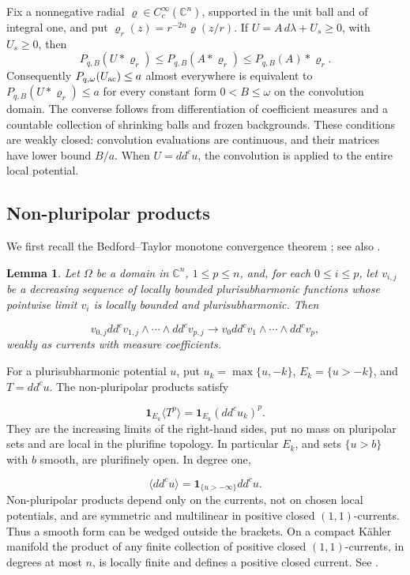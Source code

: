 \documentclass[reqno]{amsart}
\numberwithin{equation}{section}
\newtheorem{lemma}[theorem]{Lemma}
\theoremstyle{definition}
\begin{document}
Fix a nonnegative radial $\varrho\in C_c^\infty(\mathbb C^n)$, supported in the unit ball and of integral one, and put $\varrho_r(z)=r^{-2n}\varrho(z/r)$. If $U=A\,d\lambda+U_s\ge0$, with $U_s\ge0$, then
\begin{equation}\label{eq:convolution}
 P_{q,B}(U*\varrho_r)
 \le P_{q,B}(A*\varrho_r)
 \le P_{q,B}(A)*\varrho_r.
\end{equation}
Consequently $P_{q,\omega}(U_{\rm ac})\le a$ almost everywhere is equivalent to $P_{q,B}(U*\varrho_r)\le a$ for every constant form $0<B\le\omega$ on the convolution domain. The converse follows from differentiation of coefficient measures and a countable collection of shrinking balls and frozen backgrounds. These conditions are weakly closed: convolution evaluations are continuous, and their matrices have lower bound $B/a$. When $U=dd^cu$, the convolution is applied to the entire local potential.
\subsection{Non-pluripolar products} 
We first recall the Bedford--Taylor monotone convergence theorem \cite[Theorem~2.1 and Corollary~2.2]{BT82}; see also \cite[Chapter~III, Theorem~3.7(a)]{D12}.
\begin{lemma}\label{lem:bt-convergence}
    Let $\Omega$ be a domain in $\mathbb C^n$, $1\leq p\leq n$, and, for each $0\leq i\leq p$, let $v_{i,j}$ be a decreasing sequence of locally bounded plurisubharmonic functions whose pointwise limit $v_i$ is locally bounded and plurisubharmonic. Then

\[
v_{0,j}dd^cv_{1,j}\wedge\cdots\wedge dd^cv_{p,j}
\longrightarrow v_0dd^cv_1\wedge\cdots\wedge dd^cv_p,
\]
weakly as currents with measure coefficients.
\end{lemma}

For a plurisubharmonic potential $u$, put $u_k=\max\{u,-k\}$, $E_k=\{u>-k\}$, and $T=dd^cu$. The non-pluripolar products satisfy

\begin{equation}\label{eq:np-locality}
\mathbf1_{E_k}\langle T^p\rangle
=\mathbf1_{E_k}(dd^cu_k)^p.
\end{equation}
They are the increasing limits of the right-hand sides, put no mass on pluripolar sets and are local in the plurifine topology. In particular $E_k$, and sets $\{u>b\}$ with $b$ smooth, are plurifinely open. In degree one,

\begin{equation}\label{eq:np-degree-one}
\langle dd^cu\rangle=\mathbf1_{\{u>-\infty\}}dd^cu.
\end{equation}
Non-pluripolar products depend only on the currents, not on chosen local potentials, and are symmetric and multilinear in positive closed $(1,1)$-currents. Thus a smooth form can be wedged outside the brackets. On a compact K\"ahler manifold the product of any finite collection of positive closed $(1,1)$-currents, in degrees at most $n$, is locally finite and defines a positive closed current. See \cite[Section 1.2, Definition 1.1, Propositions 1.4 and 1.6, and Theorem 1.8]{BEGZ10}.
\end{document}
